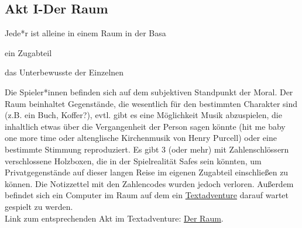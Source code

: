 \documentclass[12pt, a4paper, openany]{report}
\let\tempone\itemize
\let\temptwo\enditemize
\renewenvironment{itemize}{\tempone\addtolength{\itemsep}{-0.5\baselineskip}}{\temptwo}
\begin{document}
\subsection{Akt I-Der Raum}
\begin{itemize}
\item[R] Jede*r ist alleine in einem Raum in der Basa
\item[SR] ein Zugabteil 
\item[M] das Unterbewusste der Einzelnen
\item[P] Die Spieler*innen befinden sich auf dem subjektiven Standpunkt der Moral. 
\end{itemize}
Der Raum beinhaltet Gegenstände, die wesentlich für den bestimmten Charakter sind (z.B. ein Buch, Koffer?), evtl. gibt es eine Möglichkeit Musik abzuspielen, die inhaltlich etwas über die Vergangenheit der Person sagen könnte (\glqq hit me baby one more time\grqq{} oder altenglische Kirchenmusik von Henry Purcell) oder eine bestimmte Stimmung reproduziert.
 Es gibt 3 (oder mehr) mit Zahlenschlössern verschlossene Holzboxen, die in der Spielrealität Safes sein könnten, um Privatgegenstände auf dieser langen Reise im eigenen Zugabteil einschließen zu können.
Die Notizzettel mit den Zahlencodes wurden jedoch verloren.
Außerdem befindet sich ein Computer im Raum auf dem ein \hyperref[textadventure]{Textadventure} darauf wartet gespielt zu werden.\\
Link zum entsprechenden Akt im Textadventure: \hyperref[der-raum]{Der Raum}.
\end{document}
